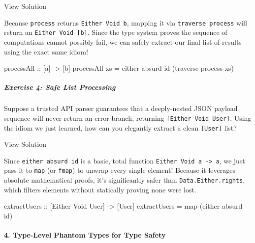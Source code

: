 \documentclass[
]{article}
\newenvironment{Shaded}{}{}
\newcommand{\DataTypeTok}[1]{\textcolor[rgb]{0.56,0.13,0.00}{#1}}
\newcommand{\FunctionTok}[1]{\textcolor[rgb]{0.02,0.16,0.49}{#1}}
\newcommand{\NormalTok}[1]{#1}
\newcommand{\OtherTok}[1]{\textcolor[rgb]{0.00,0.44,0.13}{#1}}
\begin{document}
View Solution

Because \texttt{process} returns \texttt{Either\ Void\ b}, mapping it
via \texttt{traverse\ process} will return an
\texttt{Either\ Void\ {[}b{]}}. Since the type system proves the
sequence of computations cannot possibly fail, we can safely extract our
final list of results using the exact same idiom!

\begin{Shaded}
\begin{Highlighting}[]
\OtherTok{processAll ::}\NormalTok{ [a] }\OtherTok{{-}\textgreater{}}\NormalTok{ [b]}
\NormalTok{processAll xs }\OtherTok{=} \FunctionTok{either}\NormalTok{ absurd }\FunctionTok{id}\NormalTok{ (}\FunctionTok{traverse}\NormalTok{ process xs)}
\end{Highlighting}
\end{Shaded}

\subparagraph{Exercise 4: Safe List
Processing}\label{exercise-4-safe-list-processing}

Suppose a trusted API parser guarantees that a deeply-nested JSON
payload sequence will never return an error branch, returning
\texttt{{[}Either\ Void\ User{]}}. Using the idiom we just learned, how
can you elegantly extract a clean \texttt{{[}User{]}} list?

View Solution

Since \texttt{either\ absurd\ id} is a basic, total function
\texttt{Either\ Void\ a\ -\textgreater{}\ a}, we just pass it to
\texttt{map} (or \texttt{fmap}) to unwrap every single element! Because
it leverages absolute mathematical proofs, it's significantly safer than
\texttt{Data.Either.rights}, which filters elements without statically
proving none were lost.

\begin{Shaded}
\begin{Highlighting}[]
\OtherTok{extractUsers ::}\NormalTok{ [}\DataTypeTok{Either} \DataTypeTok{Void} \DataTypeTok{User}\NormalTok{] }\OtherTok{{-}\textgreater{}}\NormalTok{ [}\DataTypeTok{User}\NormalTok{]}
\NormalTok{extractUsers }\OtherTok{=} \FunctionTok{map}\NormalTok{ (}\FunctionTok{either}\NormalTok{ absurd }\FunctionTok{id}\NormalTok{)}
\end{Highlighting}
\end{Shaded}

\paragraph{4. Type-Level Phantom Types for Type
Safety}\label{type-level-phantom-types-for-type-safety}
\end{document}
